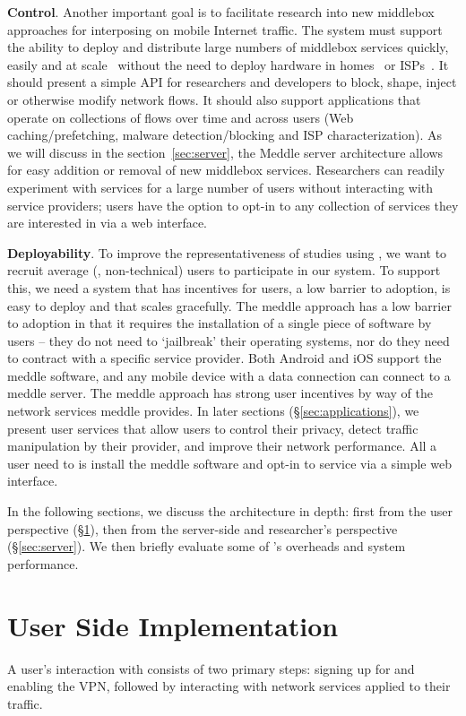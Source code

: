 \noindent\textbf{Control}. Another important goal is to facilitate research into new middlebox approaches 
for interposing on mobile Internet traffic. The system must support the ability to deploy and distribute large numbers 
of middlebox services quickly, easily and at scale~\cite{sherry:middleboxes} without 
the need to deploy hardware in homes~\cite{bismark} or ISPs~\cite{wang:middleboxes}. 
It should present a simple API for researchers and developers to block, shape, inject or otherwise 
modify network flows. It should also support applications that operate on collections of flows over 
time and across users (\eg Web caching/prefetching, malware detection/blocking and ISP characterization). 
As we will discuss in the section~\ref{sec:server}, the Meddle server architecture allows for easy addition or removal of new middlebox services.
Researchers can readily experiment with services for a large number of users without interacting with service providers; users have the option to opt-in to any collection of services they are interested in via a web interface. 


\noindent\textbf{Deployability}. To improve the representativeness of studies using \meddle, we want to 
recruit average (\ie, non-technical) users to participate in our system. To support this, we need a system 
that has incentives for users, a low barrier to adoption, is easy to deploy and that scales gracefully. 
The meddle approach has a low barrier to adoption in that it requires the installation of a single piece of software by users -- they do not need to `jailbreak' their operating systems, nor do they need to contract with a specific service provider. 
Both Android and iOS support the meddle software, and any mobile device with a data connection can connect to a meddle server.
The meddle approach has strong user incentives by way of the network services meddle provides.
In later sections (\S\ref{sec:applications}), we present user services that allow users to control their privacy, detect traffic manipulation by their provider, and improve their network performance.
All a user need to is install the meddle software and opt-in to service via a simple web interface.

In the following sections, we discuss the \meddle architecture in depth: first from the user perspective (\S\ref{sec:user}), then from the server-side and researcher's perspective (\S\ref{sec:server}). We then briefly evaluate some of \meddle's overheads and system performance.

\section{User Side Implementation}
\label{sec:user}
A user's interaction with \meddle consists of two primary steps: signing up for \meddle and enabling the VPN, followed by interacting with network services applied to their traffic.


